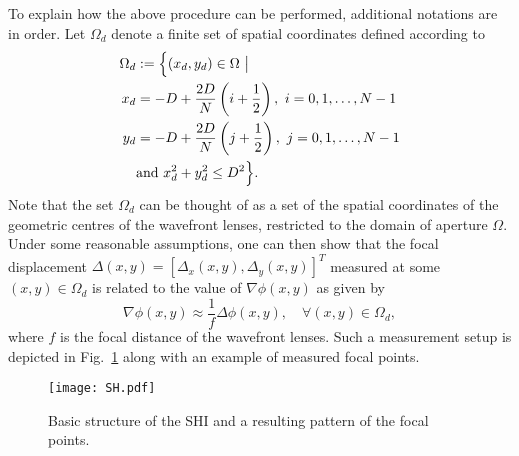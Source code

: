 \pdfoutput=1 \documentclass[journal]{IEEEtran}
\begin{document}
To explain how the above procedure can be performed, additional notations are in order. Let $\Omega_d$ denote a finite set of spatial coordinates defined according to
\begin{align}
\Omega_d &:= \Big\{ (x_d,y_d) \in \Omega \,\, \big| \notag\\
x_d &=-D+\frac{2D}{N} \left(i+\frac{1}{2}\right), \,\, i=0,1,\ldots,N-1 \\
y_d &=-D+\frac{2D}{N} \left(j+\frac{1}{2}\right), \,\, j=0,1,\ldots,N-1 \notag \\
&\mbox{and } x_d^2 + y_d^2 \le D^2 \Big\}. \notag
\end{align}
Note that the set $\Omega_d$ can be thought of as a set of the spatial coordinates of the geometric centres of the wavefront lenses, restricted to the domain of aperture $\Omega$. Under some reasonable assumptions, one can then show \cite{19} that the focal displacement $\Delta(x,y) = [\Delta_x(x,y), \Delta_y(x,y)]^T$ measured at some $(x,y) \in \Omega_d$ is related to the value of $\nabla \phi(x,y)$ as given by
\begin{equation}
\nabla \phi(x,y) \approx \frac{1}{f} \Delta \phi(x,y), \quad \forall (x,y) \in \Omega_d,
\end{equation}
where $f$ is the focal distance of the wavefront lenses. Such a measurement setup is depicted in Fig.~\ref{fig222} along with an example of measured focal points.

\begin{figure}[!t]
\centering
\texttt{[image: SH.pdf]}
\label{fig:tabsubfig21}
\caption{Basic structure of the SHI and a resulting pattern of the focal points.}
\label{fig222}
\end{figure}
\end{document}
